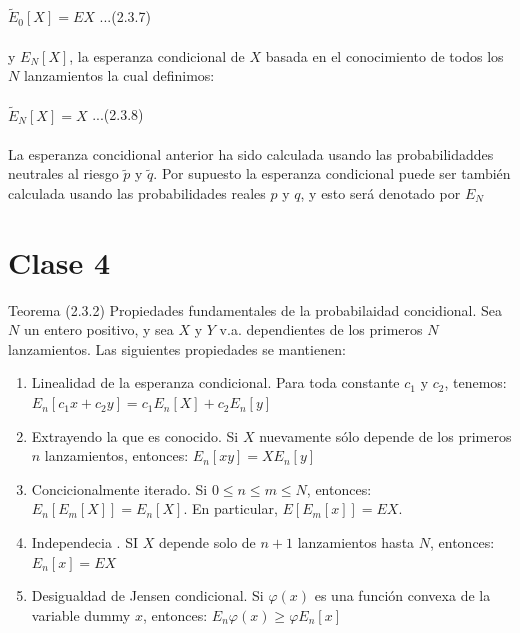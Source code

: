 \documentclass{article}
\begin{document}
        \\
        \\
        $\tilde{E}_0[X] = EX$ ...(2.3.7)
        \\
        \\
        y $E_N[X]$, la esperanza condicional de $X$ basada en el conocimiento de todos los $N$ lanzamientos la cual definimos:
        \\
        \\
        $\tilde{E}_N[X] = X$ ...(2.3.8)
        \\
        \\
        La esperanza concidional anterior ha sido calculada usando las probabilidaddes neutrales al riesgo $\tilde{p}$ y $\tilde{q}$.
        Por supuesto la esperanza condicional puede ser también calculada usando las probabilidades reales $p$ y $q$, y esto será denotado por $E_N$

        \section{Clase 4}
        Teorema (2.3.2) Propiedades fundamentales de la probabilaidad concidional.
        Sea $N$ un entero positivo, y sea $X$ y $Y$ v.a. dependientes de los primeros $N$ lanzamientos.
        Las siguientes propiedades se mantienen:
        \begin{enumerate}
            \item Linealidad de la esperanza condicional. Para toda constante $c_1$ y $c_2$, tenemos:
            $E_n[c_1 x + c_2 y] = c_1 E_n[X] + c_2 E_n[y]$
            \item Extrayendo la que es conocido. Si $X$ nuevamente sólo depende de los primeros $n$ lanzamientos, entonces:
            $E_n[xy] = X E_n[y]$
            \item Concicionalmente iterado. Si $0 \le n \le m \le N$, entonces:
            $E_n [E_m [X]] = E_n[X]$.
            En particular, $E[E_m[x]] = EX$.
            \item Independecia . SI $X$ depende solo de $n+1$ lanzamientos hasta $N$, entonces:
            $E_n[x] = EX$
            \item Desigualdad de Jensen condicional. Si $\varphi(x)$ es una función convexa de la variable dummy $x$, entonces:
            $E_n{\varphi(x)} \ge \varphi E_n[x]$
        \end{enumerate}
\end{document}
